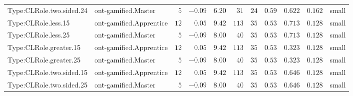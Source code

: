 \documentclass[6pt,a4paper]{article}
\begin{document}
{\begin{longtable}{llrrrrrrrrl}
Type:CLRole.two.sided.24&ont-gamified.Master&$ 5$&$-0.09$&$ 6.20$&$ 31$&$ 24$&$ 0.59$&$0.622$&$0.162$&small\tabularnewline
Type:CLRole.less.15&ont-gamified.Apprentice&$12$&$ 0.05$&$ 9.42$&$113$&$ 35$&$ 0.53$&$0.713$&$0.128$&small\tabularnewline
Type:CLRole.less.25&ont-gamified.Master&$ 5$&$-0.09$&$ 8.00$&$ 40$&$ 35$&$ 0.53$&$0.713$&$0.128$&small\tabularnewline
Type:CLRole.greater.15&ont-gamified.Apprentice&$12$&$ 0.05$&$ 9.42$&$113$&$ 35$&$ 0.53$&$0.323$&$0.128$&small\tabularnewline
Type:CLRole.greater.25&ont-gamified.Master&$ 5$&$-0.09$&$ 8.00$&$ 40$&$ 35$&$ 0.53$&$0.323$&$0.128$&small\tabularnewline
\newpage
Type:CLRole.two.sided.15&ont-gamified.Apprentice&$12$&$ 0.05$&$ 9.42$&$113$&$ 35$&$ 0.53$&$0.646$&$0.128$&small\tabularnewline
Type:CLRole.two.sided.25&ont-gamified.Master&$ 5$&$-0.09$&$ 8.00$&$ 40$&$ 35$&$ 0.53$&$0.646$&$0.128$&small\tabularnewline
\hline
\end{longtable}}
\end{document}
